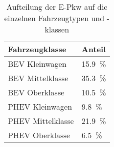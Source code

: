 {
\renewcommand{\arraystretch}{1.2}%
\begin{table}[H]
	\begin{center}
		\caption{Aufteilung der E-Pkw auf die einzelnen Fahrzeugtypen und -klassen}
		\begin{tabu} to 0.4\textwidth {X[1.5] X[1, r]}
			\toprule
			Fahrzeugklasse    & Anteil  \\ \midrule
			BEV Kleinwagen    & \SI{15.9}{\percent}               \\
			BEV Mittelklasse  & \SI{35.3}{\percent}               \\
			BEV Oberklasse    & \SI{10.5}{\percent}               \\
			PHEV Kleinwagen   & \SI{9.8}{\percent}                \\
			PHEV Mittelklasse & \SI{21.9}{\percent}               \\
			PHEV Oberklasse   & \SI{6.5}{\percent}                \\ \bottomrule
		\end{tabu}
		\label{tab:CarSplit}
	\end{center}
	\vspace{-3mm}%
\end{table}
}